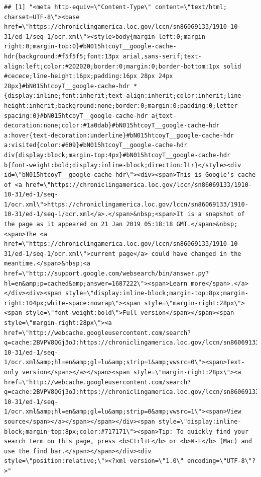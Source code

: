 \documentclass[]{gitbook}
\begin{document}
\begin{verbatim}
## [1] "<meta http-equiv=\"Content-Type\" content=\"text/html; charset=UTF-8\"><base href=\"https://chroniclingamerica.loc.gov/lccn/sn86069133/1910-10-31/ed-1/seq-1/ocr.xml\"><style>body{margin-left:0;margin-right:0;margin-top:0}#bN015htcoyT__google-cache-hdr{background:#f5f5f5;font:13px arial,sans-serif;text-align:left;color:#202020;border:0;margin:0;border-bottom:1px solid #cecece;line-height:16px;padding:16px 28px 24px 28px}#bN015htcoyT__google-cache-hdr *{display:inline;font:inherit;text-align:inherit;color:inherit;line-height:inherit;background:none;border:0;margin:0;padding:0;letter-spacing:0}#bN015htcoyT__google-cache-hdr a{text-decoration:none;color:#1a0dab}#bN015htcoyT__google-cache-hdr a:hover{text-decoration:underline}#bN015htcoyT__google-cache-hdr a:visited{color:#609}#bN015htcoyT__google-cache-hdr div{display:block;margin-top:4px}#bN015htcoyT__google-cache-hdr b{font-weight:bold;display:inline-block;direction:ltr}</style><div id=\"bN015htcoyT__google-cache-hdr\"><div><span>This is Google's cache of <a href=\"https://chroniclingamerica.loc.gov/lccn/sn86069133/1910-10-31/ed-1/seq-1/ocr.xml\">https://chroniclingamerica.loc.gov/lccn/sn86069133/1910-10-31/ed-1/seq-1/ocr.xml</a>.</span>&nbsp;<span>It is a snapshot of the page as it appeared on 21 Jan 2019 05:18:18 GMT.</span>&nbsp;<span>The <a href=\"https://chroniclingamerica.loc.gov/lccn/sn86069133/1910-10-31/ed-1/seq-1/ocr.xml\">current page</a> could have changed in the meantime.</span>&nbsp;<a href=\"http://support.google.com/websearch/bin/answer.py?hl=en&amp;p=cached&amp;answer=1687222\"><span>Learn more</span>.</a></div><div><span style=\"display:inline-block;margin-top:8px;margin-right:104px;white-space:nowrap\"><span style=\"margin-right:28px\"><span style=\"font-weight:bold\">Full version</span></span><span style=\"margin-right:28px\"><a href=\"http://webcache.googleusercontent.com/search?q=cache:2BVPV8QGj3oJ:https://chroniclingamerica.loc.gov/lccn/sn86069133/1910-10-31/ed-1/seq-1/ocr.xml&amp;hl=en&amp;gl=lu&amp;strip=1&amp;vwsrc=0\"><span>Text-only version</span></a></span><span style=\"margin-right:28px\"><a href=\"http://webcache.googleusercontent.com/search?q=cache:2BVPV8QGj3oJ:https://chroniclingamerica.loc.gov/lccn/sn86069133/1910-10-31/ed-1/seq-1/ocr.xml&amp;hl=en&amp;gl=lu&amp;strip=0&amp;vwsrc=1\"><span>View source</span></a></span></span></div><span style=\"display:inline-block;margin-top:8px;color:#717171\"><span>Tip: To quickly find your search term on this page, press <b>Ctrl+F</b> or <b>⌘-F</b> (Mac) and use the find bar.</span></span></div><div style=\"position:relative;\"><?xml version=\"1.0\" encoding=\"UTF-8\"?>"
\end{verbatim}
\end{document}
